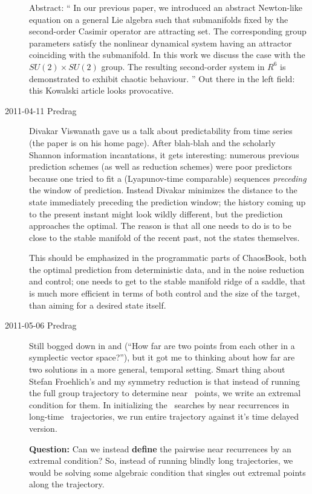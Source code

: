 \begin{description}
Abstract: ``
In our previous paper, we introduced an abstract Newton-like
equation on a general Lie algebra such that submanifolds fixed by the
second-order Casimir operator are attracting set. The corresponding group
parameters satisfy the nonlinear dynamical system having an attractor
coinciding with the submanifold. In this work we discuss the case with
the $SU(2)\times SU(2)$ group. The resulting second-order system in $R^6$
is demonstrated to exhibit chaotic behaviour.
''
Out there in the left field: this Kowalski article
looks provocative.


\item[2011-04-11 Predrag]
													\toCB
Divakar Viswanath gave us a talk about predictability from
time series (the paper is on his home page). After blah-blah
and the scholarly Shannon information incantations, it gets
interesting: numerous previous prediction schemes (as well as
reduction schemes) were poor predictors because one tried to fit
a (Lyapunov-time comparable) sequences {\em preceding} the window
of prediction. Instead Divakar minimizes the distance to the
state immediately preceding the prediction window; the history
coming up to the present instant might look wildly different, but
the prediction approaches the optimal. The reason is that all
one needs to do is to be close to the stable manifold of the
recent past, not the states themselves.

This should be emphasized in the programmatic parts of ChaosBook,
both the optimal prediction from deterministic data, and in the
noise reduction and control; one needs to get to the stable manifold
ridge of a saddle, that is much more efficient in terms of both control
and the size of the target, than aiming for a desired state itself.

\item[2011-05-06 Predrag] Still bogged down in 
and  (``How far are two points from each other
in a symplectic vector space?''), but it got me to thinking about
how far are two solutions in a more general, temporal setting. Smart thing
about Stefan Froehlich's and my symmetry reduction is that instead of
running the full group trajectory to determine near \statesp\ points, we
write an extremal condition for them. In initializing
the \po\ searches by near recurrences in long-time \statesp\
trajectories, we run entire trajectory against it's time delayed version.

\textbf{Question:} Can we instead {\bf define}
the pairwise near recurrences by an extremal
condition? So, instead of running blindly long trajectories, we would
be solving some algebraic condition that singles out extremal points
along the trajectory.


\end{description}
